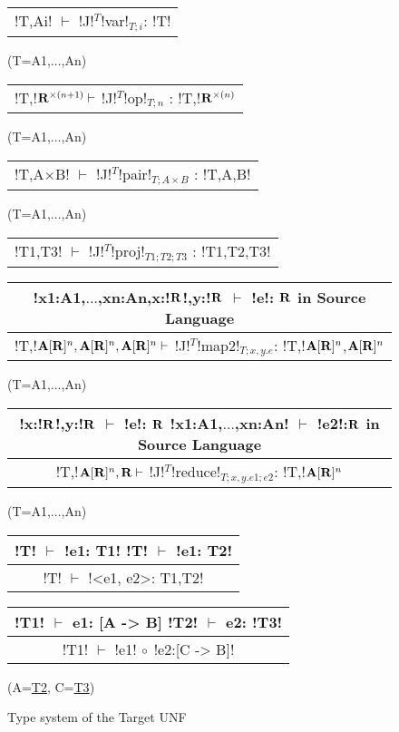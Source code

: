 \begin{figure*}[tb]
    \centering
    \begin{tabular}{c} 
        \\\hline
        !T,Ai! $\vdash$ !J!$^T$!var!$_{T;i}$: !T!
        \end{tabular}(T=A1,$\ldots$,An)
        \hspace{0.5cm}
        \begin{tabular}{c}
            \\\hline
            !T,!$\mathbf{R}^{\times(n+1)} \vdash$ !J!$^T$!op!$_{T;n}$ : !T,!$\mathbf{R}^{\times(n)}$
        \end{tabular}(T=A1,$\ldots$,An)
    
        \begin{tabular}{c}
            \\\hline
            !T,A$\times$B! $\vdash$ !J!$^T$!pair!$_{T;A\times B}$ : !T,A,B!
        \end{tabular}(T=A1,$\ldots$,An)
    
        \begin{tabular}{c}
            \\\hline
            !T1,T3! $\vdash$ !J!$^T$!proj!$_{T1;T2;T3}$ : !T1,T2,T3!
        \end{tabular}
    
        \begin{tabular}{c}
            !x1:A1,$\ldots$,xn:An,x:!$\mathbf{R}$!,y:!$\mathbf{R}$ $\vdash$ !e!: $\mathbf{R}$ \quad in Source Language
            \\\hline  
            !T,!$\mathbf{A}[\mathbf{R}]^{n},\mathbf{A}[\mathbf{R}]^{n},\mathbf{A}[\mathbf{R}]^{n} \vdash$ !J!$^T$!map2!$_{T; x,y.e}$: !T,!$\mathbf{A}[\mathbf{R}]^{n}$,$\mathbf{A}[\mathbf{R}]^{n}$
        \end{tabular}(T=A1,$\ldots$,An)
    
        \begin{tabular}{c}
            !x:!$\mathbf{R}$!,y:!$\mathbf{R}$ $\vdash$ !e!: $\mathbf{R}$ \quad !x1:A1,$\ldots$,xn:An! $\vdash$ !e2!:$\mathbf{R}$ \quad in Source Language
            \\\hline  
            !T,!$\mathbf{A}[\mathbf{R}]^{n},\mathbf{R} \vdash$ !J!$^T$!reduce!$_{T; x,y.e1; e2}$: !T,!$\mathbf{A}[\mathbf{R}]^{n}$
        \end{tabular}(T=A1,$\ldots$,An)

        \begin{tabular}{c}
            !T! $\vdash$ !e1: T1!  \quad !T! $\vdash$ !e1: T2!
            \\ \hline
            !T! $\vdash$ !<e1, e2>: T1,T2!
        \end{tabular}

        \begin{tabular}{c}
            !T1! $\vdash$ e1: [A -> B]  \quad !T2! $\vdash$ e2: !T3! 
            \\ \hline
            !T1! $\vdash$ !e1! $\circ$ !e2:[C -> B]!
        \end{tabular}(A=\underline{T2}, C=\underline{T3})

    \vspace{-0.2cm}
    \caption{Type system of the Target UNF}
    \vspace{-0.4cm}
    \label{fig:target_unf_typesystem}
    \end{figure*}